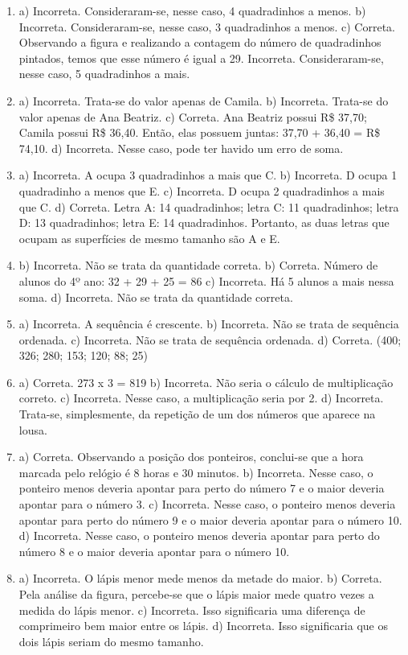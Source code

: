 \begin{enumerate}
\item
a) Incorreta. Consideraram-se, nesse caso, 4 quadradinhos a menos.
b) Incorreta. Consideraram-se, nesse caso, 3 quadradinhos a menos.
c) Correta. Observando a figura e realizando a contagem do número de quadradinhos
pintados, temos que esse número é igual a 29.
Incorreta. Consideraram-se, nesse caso, 5 quadradinhos a mais.

\item
a) Incorreta. Trata-se do valor apenas de Camila.
b) Incorreta. Trata-se do valor apenas de Ana Beatriz.
c) Correta. Ana Beatriz possui R\$ 37,70; Camila possui R\$ 36,40. Então, elas possuem juntas: 37,70 + 36,40 = R\$ 74,10.
d) Incorreta. Nesse caso, pode ter havido um erro de soma.

\item
a) Incorreta. A ocupa 3 quadradinhos a mais que C.
b) Incorreta. D ocupa 1 quadradinho a menos que E.
c) Incorreta. D ocupa 2 quadradinhos a mais que C.
d) Correta. Letra A: 14 quadradinhos; letra C: 11 quadradinhos; letra D: 13 quadradinhos; letra E: 14 quadradinhos. Portanto, as duas letras que ocupam as superfícies de mesmo tamanho são A e E.

\item
b) Incorreta. Não se trata da quantidade correta.
b) Correta. Número de alunos do 4º ano: 32 + 29 + 25 = 86 
c) Incorreta. Há 5 alunos a mais nessa soma.
d) Incorreta. Não se trata da quantidade correta.

\item
a) Incorreta. A sequência é crescente.
b) Incorreta. Não se trata de sequência ordenada.
c) Incorreta. Não se trata de sequência ordenada.
d) Correta. (400; 326; 280; 153; 120; 88; 25)

\item
a) Correta. 273 x 3 = 819
b) Incorreta. Não seria o cálculo de multiplicação correto.
c) Incorreta. Nesse caso, a multiplicação seria por 2.
d) Incorreta. Trata-se, simplesmente, da repetição de um dos números que aparece na lousa.

\item
a) Correta. Observando a posição dos ponteiros, conclui-se que a hora marcada pelo
relógio é 8 horas e 30 minutos.
b) Incorreta. Nesse caso, o ponteiro menos deveria apontar para perto do número 7 e o maior deveria apontar para o número 3.
c) Incorreta. Nesse caso, o ponteiro menos deveria apontar para perto do número 9 e o maior deveria apontar para o número 10.
d) Incorreta. Nesse caso, o ponteiro menos deveria apontar para perto do número 8 e o maior deveria apontar para o número 10.

\item
a) Incorreta. O lápis menor mede menos da metade do maior.
b) Correta. Pela análise da figura, percebe-se que o lápis maior mede quatro vezes a medida do lápis menor.
c) Incorreta. Isso significaria uma diferença de comprimeiro bem maior entre os lápis.
d) Incorreta. Isso significaria que os dois lápis seriam do mesmo tamanho.
\end{enumerate}


